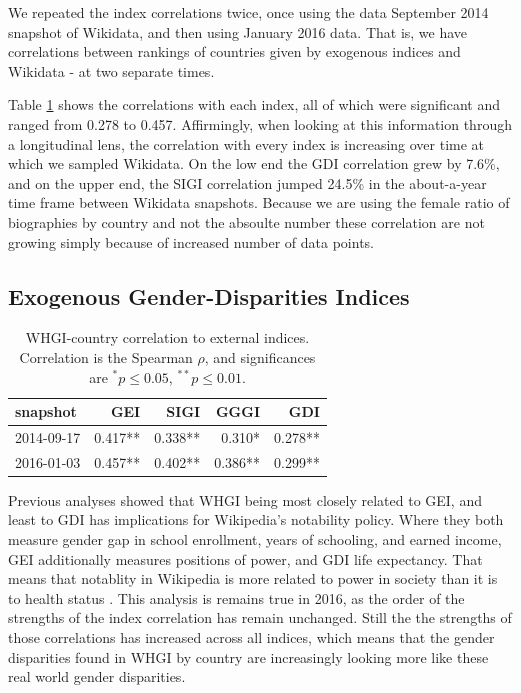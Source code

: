 \documentclass{sig-alternate-05-2015}
\begin{document}
We repeated the index correlations twice, once using the data  September 2014 snapshot of Wikidata, and then using January 2016 data. That is, we have correlations between rankings of countries given by exogenous indices and Wikidata - at two separate times.

Table \ref{table:scores} shows the correlations with each index, all of which were significant and ranged from 0.278 to 0.457. Affirmingly, when looking at this information through a longitudinal lens, the correlation with every index is increasing over time at which we sampled Wikidata. On the low end the GDI correlation grew by 7.6\%, and on the upper end, the SIGI correlation jumped 24.5\% in the about-a-year time frame between Wikidata snapshots. Because we are using the  female ratio of biographies by country and not the absoulte number these correlation are not growing simply because of increased number of data points.

\subsection{Exogenous Gender-Disparities Indices}
\begin{table}
\caption{WHGI-country correlation to external indices. Correlation is the Spearman $\rho$, and significances are $ ^*p\leq 0.05 $, $ ^{**}p\leq 0.01$.}
\label{table:scores}
\begin{tabular}{lrrrr}
\toprule
snapshot &  GEI &  SIGI &  GGGI &  GDI  \\
\midrule
2014-09-17 &  0.417** &       0.338** &          0.310* &         0.278**  \\
2016-01-03 &  0.457** &       0.402** &          0.386** &         0.299**  \\
\bottomrule
\end{tabular}
\end{table}

Previous analyses showed that WHGI being most closely related to GEI, and least to GDI has implications for Wikipedia's notability policy. Where they both measure gender gap in school enrollment, years of schooling, and earned income, GEI additionally measures positions of power, and GDI life expectancy. That means that notablity in Wikipedia is more related to power in society than it is to health status \cite{klein_wikipedia_2015}. This analysis is remains true in 2016, as the order of the strengths of the index correlation has remain unchanged. Still the the strengths of those correlations has increased across all indices, which means that the gender disparities found in WHGI by country are increasingly looking more like these real world gender disparities.
\end{document}

